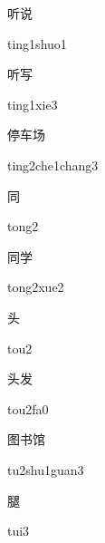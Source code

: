 \begin{multicols*}{2}
\begin{verbete}{听说}
\begin{pronuncia}{ting1shuo1}
\end{pronuncia}
\end{verbete}

\begin{verbete}{听写}
\begin{pronuncia}{ting1xie3}
\end{pronuncia}
\end{verbete}

\begin{verbete}{停车场}
\begin{pronuncia}{ting2che1chang3}
\end{pronuncia}
\end{verbete}

\begin{verbete}[tong2]{同}
\begin{pronuncia}{tong2}
\end{pronuncia}
\end{verbete}

\begin{verbete}{同学}
\begin{pronuncia}{tong2xue2}
\end{pronuncia}
\end{verbete}

\begin{verbete}[tou2]{头}
\begin{pronuncia}{tou2}
\end{pronuncia}
\end{verbete}

\begin{verbete}[tou2fa0]{头发}
\begin{pronuncia}{tou2fa0}
\end{pronuncia}
\end{verbete}

\begin{verbete}{图书馆}
\begin{pronuncia}{tu2shu1guan3}
\end{pronuncia}
\end{verbete}

\begin{verbete}[tui3]{腿}
\begin{pronuncia}{tui3}
\end{pronuncia}
\end{verbete}

\end{multicols*}
